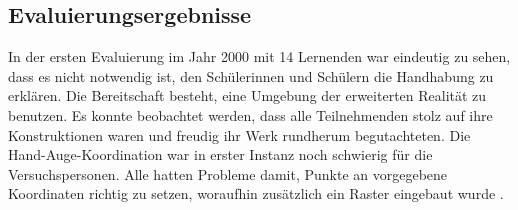 \documentclass[deutsch]{llncs}
\begin{document}
\subsection{Evaluierungsergebnisse}
In der ersten Evaluierung im Jahr 2000 mit 14 Lernenden war eindeutig zu sehen, dass es nicht notwendig ist, den Schülerinnen und Schülern die Handhabung zu erklären. Die Bereitschaft besteht, eine Umgebung der erweiterten Realität zu benutzen. Es konnte beobachtet werden, dass alle Teilnehmenden stolz auf ihre Konstruktionen waren und freudig ihr Werk rundherum begutachteten. Die Hand-Auge-Koordination war in erster Instanz noch schwierig für die Versuchspersonen. Alle hatten Probleme damit, Punkte an vorgegebene Koordinaten richtig zu setzen, woraufhin zusätzlich ein Raster eingebaut wurde \cite{Kaufmann:2002:MGE:1242073.1242086}.\\
\end{document}

